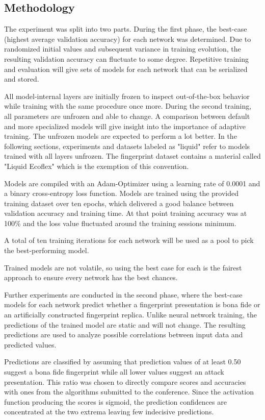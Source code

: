 


\subsection{Methodology}
The experiment was split into two parts.
During the first phase, the best-case (highest average validation accuracy) for each network was determined.
Due to randomized initial values and subsequent variance in training evolution, the resulting validation accuracy can fluctuate to some degree.
Repetitive training and evaluation will give sets of models for each network that can be serialized and stored.

All model-internal layers are initially frozen to inspect out-of-the-box behavior while training with the same procedure once more.
During the second training, all parameters are unfrozen and able to change.
A comparison between default and more specialized models will give insight into the importance of adaptive training.
The unfrozen models are expected to perform a lot better.
In the following sections, experiments and datasets labeled as "liquid" refer to models trained with all layers unfrozen.
The fingerprint dataset contains a material called "Liquid Ecoflex" which is the exemption of this convention.

Models are compiled with an Adam-Optimizer using a learning rate of 0.0001 and a binary cross-entropy loss function.
Models are trained using the provided training dataset over ten epochs, which delivered a good balance between validation accuracy and training time.
At that point training accuracy was at 100\% and the loss value fluctuated around the training sessions minimum.

A total of ten training iterations for each network will be used as a pool to pick the best-performing model.

Trained models are not volatile, so using the best case for each is the fairest approach to ensure every network has the best chances.

Further experiments are conducted in the second phase, where the best-case models for each network predict whether a fingerprint presentation is bona fide or an artificially constructed fingerprint replica.
Unlike neural network training, the predictions of the trained model are static and will not change.
The resulting predictions are used to analyze possible correlations between input data and predicted values.

Predictions are classified by assuming that prediction values of at least 0.50 suggest a bona fide fingerprint while all lower values suggest an attack presentation.
This ratio was chosen to directly compare scores and accuracies with ones from the algorithms submitted to the conference. \cite{LIVDET}
Since the activation function producing the scores is sigmoid, the prediction confidences are concentrated at the two extrema leaving few indecisive predictions.

